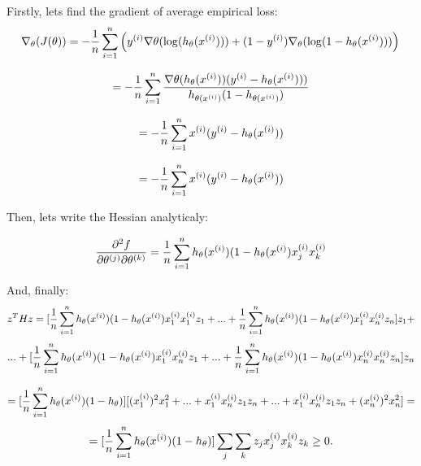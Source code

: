 \begin{answer}
Firstly, lets find the gradient of average empirical loss:
\begin{equation*}
	\nabla_\theta(J(\theta))
	= -\frac{1}{\nexp} \sum_{i=1}^\nexp \left(y^{(i)} \nabla \theta(\log(h_{\theta}(x^{(i)})))
		+  (1 - y^{(i)}) \nabla_\theta(\log(1 - h_{\theta}(x^{(i)})))\right) \newline
\end{equation*}

\begin{equation*}
	=  -\frac{1}{{n}} \sum_{i=1}^{n} \frac{\nabla \theta(h_{\theta}(x^{(i)})) (y^{(i)} - h_{\theta}(x^{(i)})))}{h_{\theta(x^{(i)})} (1-h_{\theta(x^{(i)})})}
\end{equation*}

\begin{equation*}
	=  -\frac{1}{{n}} \sum_{i=1}^{n} x^{(i)} (y^{(i)} - h_{\theta}(x^{(i)}))
\end{equation*}


\begin{equation*}
	=  -\frac{1}{{n}} \sum_{i=1}^{n} x^{(i)} (y^{(i)} - h_{\theta}(x^{(i)}))
\end{equation*}

Then, lets write the Hessian analyticaly:

\begin{equation*}
\frac{\partial^2 f}{\partial \theta^{(j)} \partial \theta^{(k)}} = \frac{1}{{n}} \sum_{i=1}^{n} 
h_{\theta}(x^{(i)}) (1-h_{\theta}(x^{(i)})x_{j}^{(i)}x_{k}^{(i)}
\end{equation*}

And, finally:
\begin{equation*}
z^T H z = [\frac{1}{{n}} \sum_{i=1}^{n} h_{\theta}(x^{(i)}) (1-h_{\theta}(x^{(i)})x_{1}^{(i)}x_{1}^{(i)}z_{1} + ... + \frac{1}{{n}} \sum_{i=1}^{n} h_{\theta}(x^{(i)}) (1-h_{\theta}(x^{(i)})x_{1}^{(i)}x_{n}^{(i)}z_{n}]z_{1} +
\end{equation*}
\begin{equation*}
 ... + [\frac{1}{{n}} \sum_{i=1}^{n} h_{\theta}(x^{(i)}) (1-h_{\theta}(x^{(i)})x_{1}^{(i)}x_{n}^{(i)}z_{1} + ... + \frac{1}{{n}} \sum_{i=1}^{n} h_{\theta}(x^{(i)}) (1-h_{\theta}(x^{(i)})x_{n}^{(i)}x_{n}^{(i)}z_{n}]z_{n}
\end{equation*}

\begin{equation*}
= [\frac{1}{{n}} \sum_{i=1}^{n} h_{\theta}(x^{(i)}) (1-h_{\theta})][(x_{1}^{(i)})^{2} x_{1}^{2} + ... + x_{1}^{(i)}x_{n}^{(i)}z_{1}z_{n} + ... + x_{1}^{(i)}x_{n}^{(i)}z_{1}z_{n} + (x_{n}^{(i)})^{2} x_{n}^{2}] = 
\end{equation*}
\begin{equation*}
= [\frac{1}{{n}} \sum_{i=1}^{n} h_{\theta}(x^{(i)}) (1-h_{\theta})] \sum_{j}\sum_{k} z_{j}x_{j}^{(i)}x_{k}^{(i)}z_{k} \ge 0.
\end{equation*}
\end{answer}
